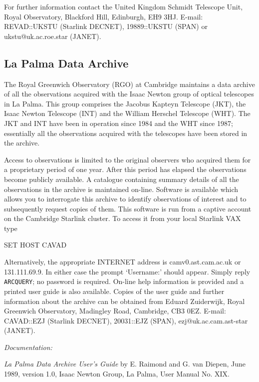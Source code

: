 \documentclass[twoside,11pt,nolof]{starlink}
\begin{document}
For further information contact the United Kingdom Schmidt Telescope
Unit, Royal Observatory, Blackford Hill, Edinburgh, EH9 3HJ. E-mail:
REVAD::UKSTU (Starlink DECNET), 19889::UKSTU (SPAN) or
ukstu@uk.ac.roe.star (JANET).


\subsection{La Palma Data Archive
\label{LAPALMA}}

The Royal Greenwich Observatory (RGO) at Cambridge maintains a data
archive of all the observations acquired with the Isaac Newton group
of optical telescopes in La Palma. This group comprises the Jacobus
Kapteyn Telescope (JKT), the Isaac Newton Telescope (INT) and the
William Herschel Telescope (WHT). The JKT and INT have been in
operation since 1984 and the WHT since 1987; essentially all the
observations acquired with the telescopes have been stored in the
archive.

Access to observations is limited to the original observers who acquired
them for a proprietary period of one year. After this period has
elapsed the observations become publicly available. A catalogue
containing summary details of all the observations in the archive is
maintained on-line. Software is available which allows you to
interrogate this archive to identify observations of interest and to
subsequently request copies of them. This software is run from a captive
account on the Cambridge Starlink cluster. To access it from your local
Starlink VAX type

\begin{terminalv}
    SET  HOST  CAVAD
\end{terminalv}

Alternatively, the appropriate INTERNET address is camv0.ast.cam.ac.uk
or 131.111.69.9. In either case the prompt `Username:' should appear.
Simply reply \verb-ARCQUERY-; no password is required. On-line help
information is provided and a printed user guide is also available.
Copies of the user guide and further information about the archive can
be obtained from Eduard Zuiderwijk, Royal Greenwich Observatory,
Madingley Road, Cambridge, CB3 0EZ. E-mail: CAVAD::EZJ (Starlink
DECNET), 20031::EJZ (SPAN), ezj@uk.ac.cam.ast-star (JANET).

\textit{Documentation:}

\textit{La Palma Data Archive User's Guide} by E. Raimond and G. van
Diepen, June 1989, version 1.0, Isaac Newton Group, La Palma, User
Manual No. XIX.
\end{document}
